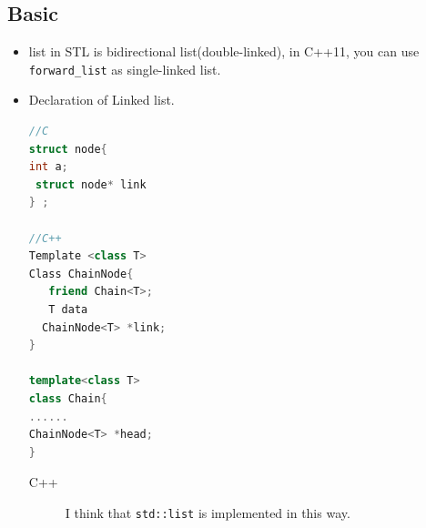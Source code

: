 \documentclass[a4paper,11pt,twoside]{book}
\begin{document}
\subsection{Basic}
\begin{itemize}
\item list in STL is bidirectional list(double-linked), in C++11, you can use \texttt{forward\_list} as single-linked list. 


\item  Declaration of Linked list. 
\begin{lstlisting}[frame=single, language=c++]
//C 
struct node{ 
int a; 
 struct node* link
} ;

//C++
Template <class T>
Class ChainNode{
   friend Chain<T>;
   T data
  ChainNode<T> *link;
}

template<class T>
class Chain{
......
ChainNode<T> *head;
}
\end{lstlisting}
\begin{description}
	\item[C++] I think that \texttt{std::list} is implemented in this way.
\end{description}

\end{itemize}
\end{document}

